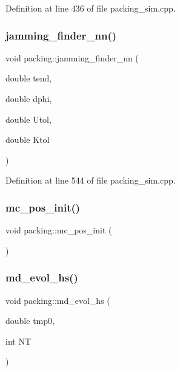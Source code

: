Definition at line 436 of file packing\+\_\+sim.\+cpp.

\mbox{\label{classpacking_a09872b70b71323f159a3490073aa1741}} 
\subsubsection{\texorpdfstring{jamming\+\_\+finder\+\_\+nn()}{jamming\_finder\_nn()}}
{\footnotesize\ttfamily void packing\+::jamming\+\_\+finder\+\_\+nn (\begin{DoxyParamCaption}\item[{double}]{tend,  }\item[{double}]{dphi,  }\item[{double}]{Utol,  }\item[{double}]{Ktol }\end{DoxyParamCaption})}



Definition at line 544 of file packing\+\_\+sim.\+cpp.

\mbox{\label{classpacking_a706d5c77cb054dadbf181fe1b68c6eda}} 
\subsubsection{\texorpdfstring{mc\+\_\+pos\+\_\+init()}{mc\_pos\_init()}}
{\footnotesize\ttfamily void packing\+::mc\+\_\+pos\+\_\+init (\begin{DoxyParamCaption}{ }\end{DoxyParamCaption})}

\mbox{\label{classpacking_a4a4cc64305d5f1726e1a49e5a395f7e9}} 
\subsubsection{\texorpdfstring{md\+\_\+evol\+\_\+hs()}{md\_evol\_hs()}}
{\footnotesize\ttfamily void packing\+::md\+\_\+evol\+\_\+hs (\begin{DoxyParamCaption}\item[{double}]{tmp0,  }\item[{int}]{NT }\end{DoxyParamCaption})}



